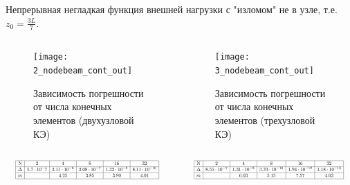 \documentclass[7pt]{beamer}
\numberwithin{equation}{section}
\newcommand*{\Scale}[2][4]{\scalebox{#1}{$#2$}}
\begin{document}
\begin{frame}{}
	Непрерывная негладкая функция внешней нагрузки с "изломом" не в узле, т.е.
	$z_{0}=\frac{3L}{7}.$ 
	
	
	\begin{columns}
		\begin{column}{0.57\textwidth}
			\begin{figure}[H]
				\centering
				\texttt{[image: 2\_nodebeam\_cont\_out]}
				\caption{Зависимость погрешности от числа конечных элементов (двухузловой КЭ)}
				\label{fig:2_nodebeam_cont_out}
			\end{figure}
		\end{column}
		\begin{column}{0.57\textwidth}
			\begin{figure}[H]
				\centering
				\texttt{[image: 3\_nodebeam\_cont\_out]}
				\caption{Зависимость погрешности от числа конечных элементов (трехузловой КЭ)}
				\label{fig:3_nodebeam_cont_out}
			\end{figure}
		\end{column}
	\end{columns}
	\begin{columns}
		\begin{column}{0.5\textwidth}
			\[
				\Scale[0.5] {
						\begin{array}{|c|c|c|c|c|c|}
								\hline
								\text{N} & 2 & 4 & 8 & 16 & 32 \\ \hline
								\Delta  & 5.7 \cdot 10^-7 & 3.11 \cdot 10^{-6} & 2.08 \cdot 10^{-7} & 1.32 \cdot 10^{-8} & 8.11 \cdot 10^{-10}\\ \hline
								m  &  &4.25 & 3.85 & 3.90 & 4.01 \\ 
								\hline
								\end{array}
				}
			\]
		\end{column}
		\begin{column}{0.5\textwidth}
			\[
					\Scale[0.5] {
			\begin{array}{|c|c|c|c|c|c|}
			\hline
			\text{N} & 2 & 4 & 8 & 16 & 32 \\ \hline
			\Delta  & 8.55 \cdot 10^{-7} & 1.31 \cdot 10^{-8} & 3.70 \cdot 10^{-10} & 1.94 \cdot 10^{-12} & 1.18 \cdot 10^{-13}  \\ \hline
			m  & & 6.03 & 5.15 & 7.57 & 4.03 \text{} \\ 
			\hline
			\end{array}
				}
				\]
		\end{column}
	\end{columns}
\end{frame}
\end{document}
